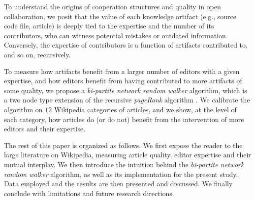 To understand the origins of cooperation structures and quality in open collaboration, we posit that the value of each knowledge artifact (e.g., source code file, article) is deeply tied to the expertise and the number of its contributors, who can witness potential mistakes or outdated information. Conversely, the expertise of contributors is a function of artifacts contributed to, and so on, recursively.

To measure how artifacts benefit from a larger number of editors with a given expertise, and how editors benefit from having contributed to more artifacts of some quality, we propose a {\it bi-partite network random walker} algorithm, which is a two node type extension of the recursive {\it pageRank} algorithm \cite{page1999pagerank,kleinberg1999}. We calibrate the algorithm on $12$ Wikipedia categories of articles, and we show, at the level of each category, how articles do (or do not) benefit from the intervention of more editors and their expertise.

The rest of this paper is organized as follows. We first expose the reader to the large literature on Wikipedia, measuring article quality, editor expertise and their mutual interplay. We then introduce the intuition behind the {\it bi-partite network random walker} algorithm, as well as its implementation for the present study. Data employed and the results are then presented and discussed. We finally conclude with limitations and future research directions.
